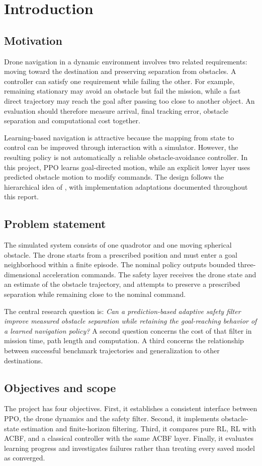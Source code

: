 \chapter{Introduction}\label{ch:introduction}
\section{Motivation}
Drone navigation in a dynamic environment involves two related requirements: moving toward the destination and preserving separation from obstacles. A controller can satisfy one requirement while failing the other. For example, remaining stationary may avoid an obstacle but fail the mission, while a fast direct trajectory may reach the goal after passing too close to another object. An evaluation should therefore measure arrival, final tracking error, obstacle separation and computational cost together.

Learning-based navigation is attractive because the mapping from state to control can be improved through interaction with a simulator. However, the resulting policy is not automatically a reliable obstacle-avoidance controller. In this project, PPO learns goal-directed motion, while an explicit lower layer uses predicted obstacle motion to modify commands. The design follows the hierarchical idea of \textcite{gao2026}, with implementation adaptations documented throughout this report.

\section{Problem statement}
The simulated system consists of one quadrotor and one moving spherical obstacle. The drone starts from a prescribed position and must enter a goal neighborhood within a finite episode. The nominal policy outputs bounded three-dimensional acceleration commands. The safety layer receives the drone state and an estimate of the obstacle trajectory, and attempts to preserve a prescribed separation while remaining close to the nominal command.

The central research question is: \emph{Can a prediction-based adaptive safety filter improve measured obstacle separation while retaining the goal-reaching behavior of a learned navigation policy?} A second question concerns the cost of that filter in mission time, path length and computation. A third concerns the relationship between successful benchmark trajectories and generalization to other destinations.

\section{Objectives and scope}
The project has four objectives. First, it establishes a consistent interface between PPO, the drone dynamics and the safety filter. Second, it implements obstacle-state estimation and finite-horizon filtering. Third, it compares pure RL, RL with ACBF, and a classical controller with the same ACBF layer. Finally, it evaluates learning progress and investigates failures rather than treating every saved model as converged.

